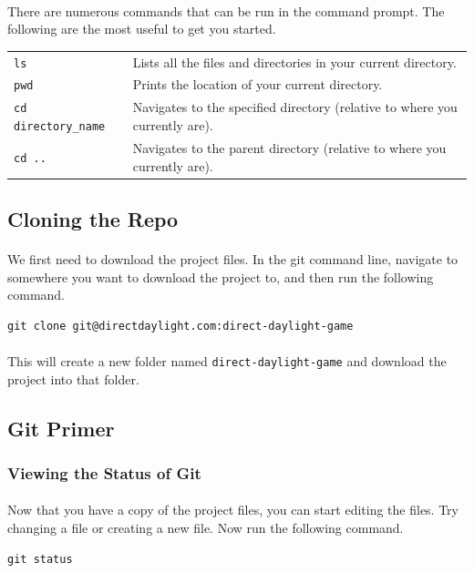 \documentclass[11pt]{article}
\begin{document}
\paragraph{}
There are numerous commands that can be run in the command prompt. The following are the most useful to get you started.
\begin{center}
\begin{tabular}{ll}
\lstinline!ls! & Lists all the files and directories in your current directory.\\ 
\lstinline!pwd! & Prints the location of your current directory.\\
\lstinline!cd directory_name! & Navigates to the specified directory (relative to where you currently are).\\
\lstinline!cd .. ! & Navigates to the parent directory (relative to where you currently are).\\
\end{tabular} 
\end{center}
\subsection{Cloning the Repo}
\paragraph{}
We first need to download the project files. In the git command line, navigate to somewhere you want to download the project to, and then run the following command.
\begin{lstlisting}
git clone git@directdaylight.com:direct-daylight-game
\end{lstlisting}
\paragraph{}
This will create a new folder named \lstinline{direct-daylight-game} and download the project into that folder.
\subsection{Git Primer}
\subsubsection{Viewing the Status of Git}
\paragraph{}
Now that you have a copy of the project files, you can start editing the files. Try changing a file or creating a new file. Now run the following command.
\begin{lstlisting}
git status
\end{lstlisting}
\end{document}
